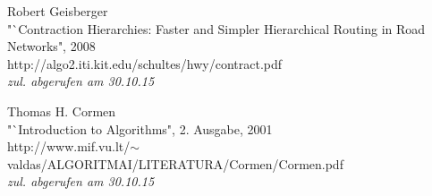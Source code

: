 \documentclass[12pt]{article}
\begin{document}
\begin{thebibliography}{99}
 Robert Geisberger\\
\newblock "`Contraction Hierarchies: Faster and Simpler Hierarchical Routing in Road Networks", 2008\\
\newblock http://algo2.iti.kit.edu/schultes/hwy/contract.pdf \\\emph{zul. abgerufen am 30.10.15}

 Thomas H. Cormen\\
\newblock "`Introduction to Algorithms", 2. Ausgabe, 2001\\
\newblock http://www.mif.vu.lt/$\sim$valdas/ALGORITMAI/LITERATURA/Cormen/Cormen.pdf \\\emph{zul. abgerufen am 30.10.15}

\end{thebibliography}
\newpage






\end{document}
